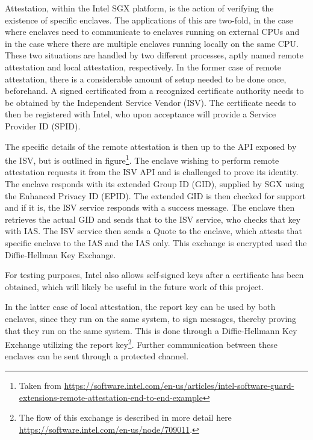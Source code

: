 \documentclass[12pt]{article}
\begin{document}
			Attestation, within the Intel SGX platform, is the action of verifying the existence of specific enclaves.
			The applications of this are two-fold, in the case where enclaves need to communicate to enclaves running on external CPUs and in the case where there are multiple enclaves running locally on the same CPU.
			These two situations are handled by two different processes, aptly named remote attestation and local attestation, respectively.
			In the former case of remote attestation, there is a considerable amount of setup needed to be done once, beforehand.
			A signed certificated from a recognized certificate authority needs to be obtained by the Independent Service Vendor (ISV).
			The certificate needs to then be registered with Intel, who upon acceptance will provide a Service Provider ID (SPID).

			The specific details of the remote attestation is then up to the API exposed by the ISV, but is outlined in figure\footnote{Taken from \url{https://software.intel.com/en-us/articles/intel-software-guard-extensions-remote-attestation-end-to-end-example}}.
			The enclave wishing to perform remote attestation requests it from the ISV API and is challenged to prove its identity.
			The enclave responds with its extended Group ID (GID), supplied by SGX using the Enhanced Privacy ID (EPID).
			The extended GID is then checked for support and if it is, the ISV service responds with a success message.
			The enclave then retrieves the actual GID and sends that to the ISV service, who checks that key with IAS.
			The ISV service then sends a Quote to the enclave, which attests that specific enclave to the IAS and the IAS only.
			This exchange is encrypted used the Diffie-Hellman Key Exchange. 

			For testing purposes, Intel also allows self-signed keys after a certificate has been obtained, which will likely be useful in the future work of this project.

			In the latter case of local attestation, the report key can be used by both enclaves, since they run on the same system, to sign messages, thereby proving that they run on the same system.
			This is done through a Diffie-Hellmann Key Exchange utilizing the report key\footnote{The flow of this exchange is described in more detail here \url{https://software.intel.com/en-us/node/709011}.}.
			Further communication between these enclaves can be sent through a protected channel.
\end{document}
